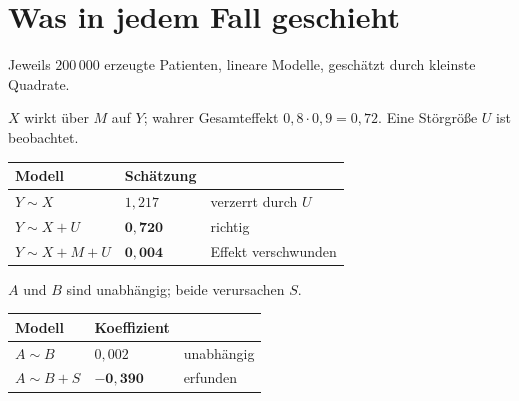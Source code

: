 \section{Was in jedem Fall geschieht}

\begin{merksatz}
Jeweils $200\,000$ erzeugte Patienten, lineare Modelle, geschätzt durch kleinste Quadrate.

$X$ wirkt  über $M$ auf $Y$; wahrer Gesamteffekt $0{,}8\cdot0{,}9 = 0{,}72$. Eine Störgröße $U$ ist beobachtet.

\begin{center}
{\small
\renewcommand{\arraystretch}{1.48}
\begin{tabular}{@{}P{3.0cm}P{2.2cm}P{2.6cm}@{}}
\toprule
\textbf{Modell} & \textbf{Schätzung} & \\
\midrule
$Y \sim X$ & $1{,}217$ & verzerrt durch $U$\\
$Y \sim X + U$ & $\mathbf{0{,}720}$ & \textcolor{gruen}{richtig}\\
$Y \sim X + M + U$ & $\mathbf{0{,}004}$ & \textcolor{akzent}{Effekt verschwunden}\\
\bottomrule
\end{tabular}}
\end{center}

\begin{center}
\begin{minipage}{0.88\textwidth}
\end{minipage}
\end{center}

$A$ und $B$ sind unabhängig; beide verursachen $S$.

\begin{center}
{\small
\renewcommand{\arraystretch}{1.48}
\begin{tabular}{@{}P{2.6cm}P{2.4cm}P{2.6cm}@{}}
\toprule
\textbf{Modell} & \textbf{Koeffizient} & \\
\midrule
$A \sim B$ & $0{,}002$ & \textcolor{gruen}{unabhängig}\\
$A \sim B + S$ & $\mathbf{-0{,}390}$ & \textcolor{akzent}{erfunden}\\
\bottomrule
\end{tabular}}
\end{center}


\end{merksatz}
